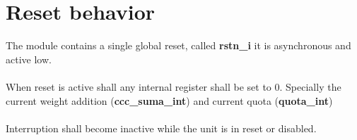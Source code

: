 \section{Reset behavior}

The module contains a single global reset, called \textbf{rstn\_i }it is asynchronous and active low.\\
\\
When reset is active shall any internal register shall be set to 0. Specially the current weight addition  (\textbf{ccc\_suma\_int}) and current quota (\textbf{quota\_int})\\
\\Interruption shall become inactive while the unit is in reset or disabled.




